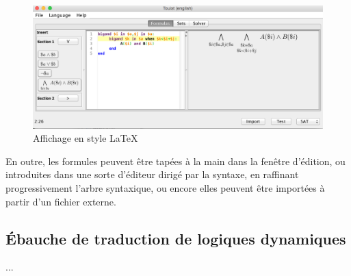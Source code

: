 \begin{figure}[htbp]
\centering
\includegraphics[scale=0.45]{Pictures/LatexDisplay.png}
  \caption{Affichage en style \LaTeX}
  \label{fig:LatexDisplay}
\end{figure}


En outre, les formules peuvent être tapées à la main dans la fenêtre d'édition, ou introduites dans une sorte d'éditeur dirigé par la syntaxe, en raffinant progressivement l'arbre syntaxique, ou encore elles peuvent être importées à partir d'un fichier externe.







\subsection{Ébauche de traduction de logiques dynamiques}
...
